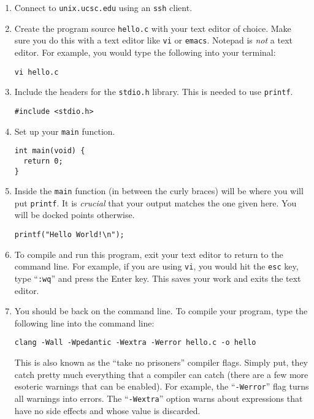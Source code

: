 \documentclass[11pt]{article}
\begin{document}
\begin{enumerate}
\item Connect to \texttt{unix.ucsc.edu} using an \texttt{ssh} client.
\item Create the program source \texttt{hello.c} with your
text editor of choice. Make sure you do this with a text
editor like \texttt{vi} or \texttt{emacs}. Notepad is \emph{not} a text editor.
For example, you would type the following into your terminal:
\begin{lstlisting}
vi hello.c
\end{lstlisting}

	\item Include the headers for the \texttt{stdio.h} library. This is needed to use \texttt{printf}.
\begin{lstlisting}
#include <stdio.h>
\end{lstlisting}

	\item Set up your \texttt{main} function.
\begin{lstlisting}
int main(void) {
  return 0;
}
\end{lstlisting}

	\item Inside the \texttt{main} function (in between the curly braces) will
        be where you will put \texttt{printf}. It is \emph{crucial} that your output matches the one given here. You will be docked points otherwise.

\begin{lstlisting}
printf("Hello World!\n");
\end{lstlisting}

	\item To compile and run this program, exit your text editor to return to the command line. For example, if you are using \texttt{vi}, you would hit the \texttt{esc} key, type ``\texttt{:wq}'' and press the Enter key. This saves your work and exits the text editor.

	\item You should be back on the command line. To compile your program, type the following line into the command line:
\begin{lstlisting}
clang -Wall -Wpedantic -Wextra -Werror hello.c -o hello\end{lstlisting}

This is also known as the ``take no prisoners'' compiler flags.
Simply put, they catch pretty much everything that a compiler can catch
(there are a few more esoteric warnings that can be
enabled). For example, the
``\texttt{-Werror}'' flag turns all warnings into errors. The ``\texttt{-Wextra}''
option warns about expressions that have no side effects and whose
value is discarded.


\end{enumerate}
\end{document}
